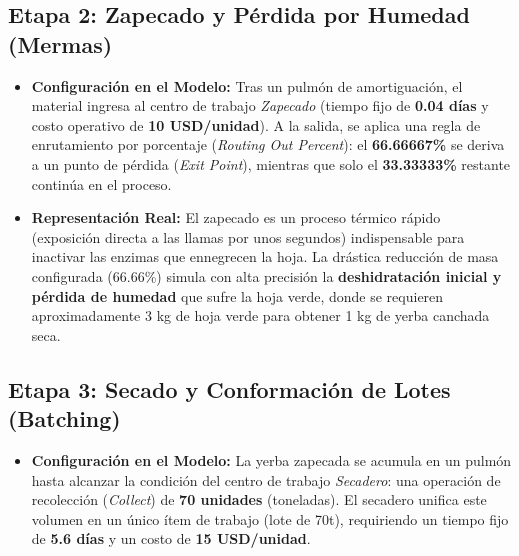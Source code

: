 \documentclass[11pt, a4paper]{article}
\begin{document}
\subsection{Etapa 2: Zapecado y Pérdida por Humedad (Mermas)}
\begin{itemize}
    \item \textbf{Configuración en el Modelo:} Tras un pulmón de amortiguación, el material ingresa al centro de trabajo \textit{Zapecado} (tiempo fijo de \textbf{0.04 días} y costo operativo de \textbf{10 USD/unidad}). A la salida, se aplica una regla de enrutamiento por porcentaje (\textit{Routing Out Percent}): el \textbf{66.66667\%} se deriva a un punto de pérdida (\textit{Exit Point}), mientras que solo el \textbf{33.33333\%} restante continúa en el proceso.
    \item \textbf{Representación Real:} El zapecado es un proceso térmico rápido (exposición directa a las llamas por unos segundos) indispensable para inactivar las enzimas que ennegrecen la hoja. La drástica reducción de masa configurada (66.66\%) simula con alta precisión la \textbf{deshidratación inicial y pérdida de humedad} que sufre la hoja verde, donde se requieren aproximadamente 3 kg de hoja verde para obtener 1 kg de yerba canchada seca.
\end{itemize}

\subsection{Etapa 3: Secado y Conformación de Lotes (Batching)}
\begin{itemize}
    \item \textbf{Configuración en el Modelo:} La yerba zapecada se acumula en un pulmón hasta alcanzar la condición del centro de trabajo \textit{Secadero}: una operación de recolección (\textit{Collect}) de \textbf{70 unidades} (toneladas). El secadero unifica este volumen en un único ítem de trabajo (lote de 70t), requiriendo un tiempo fijo de \textbf{5.6 días} y un costo de \textbf{15 USD/unidad}.
    

\end{itemize}
\end{document}
